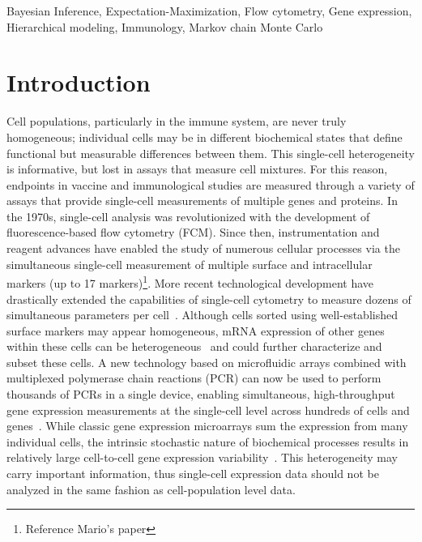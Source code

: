 \documentclass[useAMS,referee,usenatbib]{biom}
\begin{document}
\begin{keywords}
Bayesian Inference, Expectation-Maximization, Flow cytometry, Gene expression, Hierarchical modeling, Immunology, Markov chain Monte Carlo
\end{keywords}

\maketitle

\section{Introduction}
\label{s:intro}
Cell populations, particularly in the immune system, are never truly homogeneous; individual cells may be in different biochemical states that define functional but measurable differences between them. 
This single-cell heterogeneity is informative, but lost in assays that measure cell mixtures. 
For this reason, endpoints in vaccine and immunological studies are measured through a variety of assays that provide single-cell measurements of multiple genes and proteins. 
In the 1970s, single-cell analysis was revolutionized with the development of fluorescence-based flow cytometry (FCM). 
Since then, instrumentation and reagent advances have enabled the study of numerous cellular processes via the simultaneous single-cell measurement of multiple surface and intracellular markers (up to 17 markers)\footnote{Reference Mario's paper}. 
More recent technological development have drastically extended the capabilities of single-cell cytometry to measure dozens of simultaneous parameters per cell~\citep{Bendall:2011wf}. 
Although cells sorted using well-established surface markers may appear homogeneous, mRNA expression of other genes within these cells can be heterogeneous~\citep{Narsinh:2011gn, Flatz:2011jb} and could further characterize and subset these cells. 
A new technology based on microfluidic arrays combined with multiplexed polymerase chain reactions (PCR) can now be used to perform thousands of PCRs in a single device, enabling simultaneous, high-throughput gene expression measurements at the single-cell level across hundreds of cells and genes~\citep{Pieprzyk:2009uc}. 
While classic gene expression microarrays sum the expression from many individual cells, the intrinsic stochastic nature of biochemical processes results in relatively large cell-to-cell gene expression variability~\citep{vanOudenaarden200915a}. 
This heterogeneity may carry important information, thus single-cell expression data should not be analyzed in the same fashion as cell-population level data. 
\end{document}
